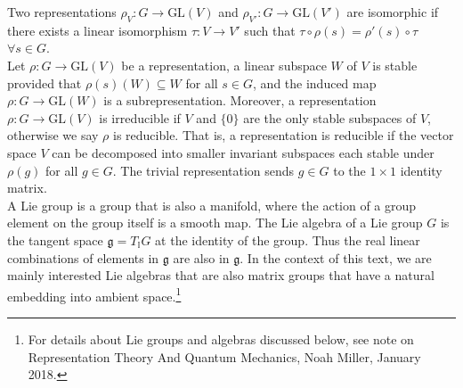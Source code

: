 \documentclass[11pt, onesided]{book}
\theoremstyle{break}
\theoremstyle{break}
\begin{document}
Two representations $\rho_V:G \to \text{GL}(V)$ and $\rho_{V'}:G \to \text{GL}(V')$ are isomorphic if there exists a linear isomorphism $\tau: V \to V'$ such that $\tau \circ \rho(s) = \rho'(s)\circ \tau$ $\forall s \in G$. \\

Let $\rho:G\to \text{GL}(V)$ be a representation, a linear subspace $W$ of $V$ is stable provided that $\rho(s)(W)\subseteq W$ for all $s \in G$, and the induced map $\rho: G\to \text{GL}(W)$ is a subrepresentation. Moreover, a representation $\rho:G\to \text{GL}(V)$ is irreducible if $V$ and $\{0\}$ are the only stable subspaces of $V$, otherwise we say $\rho$ is reducible. That is, a representation is reducible if the vector space $V$ can be decomposed into smaller invariant subspaces each stable under $\rho(g)$ for all $g \in G$. The trivial representation sends $g \in G$ to the $1\times 1$ identity matrix. \\

A Lie group is a group that is also a manifold, where the action of a group element on the group itself is a smooth map. The Lie algebra of a Lie group $G$ is the tangent space $\mathfrak{g} = T_\mathbb{I}G$ at the identity of the group. Thus the real linear combinations of elements in $\mathfrak{g}$ are also in $\mathfrak{g}$. In the context of this text, we are mainly interested Lie algebras that are also matrix groups that have a natural embedding into ambient space.\footnote{For details about Lie groups and algebras discussed below, see note on Representation Theory And Quantum Mechanics, Noah Miller, January 2018.}\\
\end{document}
